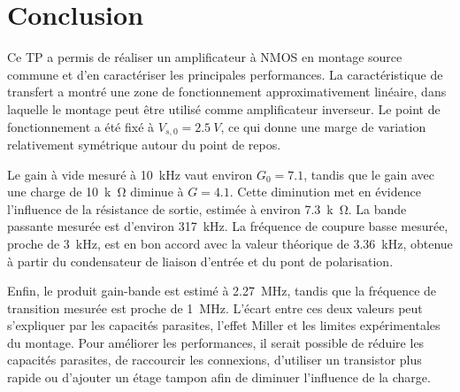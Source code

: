 \documentclass[11pt,a4paper]{article}
\begin{document}
\section{Conclusion}

Ce TP a permis de réaliser un amplificateur à NMOS en montage source commune et d'en caractériser les principales performances. La caractéristique de transfert a montré une zone de fonctionnement approximativement linéaire, dans laquelle le montage peut être utilisé comme amplificateur inverseur. Le point de fonctionnement a été fixé à $V_{s,0}=\SI{2.5}{V}$, ce qui donne une marge de variation relativement symétrique autour du point de repos.

Le gain à vide mesuré à \SI{10}{kHz} vaut environ $G_0=7.1$, tandis que le gain avec une charge de \SI{10}{k\ohm} diminue à $G=4.1$. Cette diminution met en évidence l'influence de la résistance de sortie, estimée à environ \SI{7.3}{k\ohm}. La bande passante mesurée est d'environ \SI{317}{kHz}. La fréquence de coupure basse mesurée, proche de \SI{3}{kHz}, est en bon accord avec la valeur théorique de \SI{3.36}{kHz}, obtenue à partir du condensateur de liaison d'entrée et du pont de polarisation.

Enfin, le produit gain-bande est estimé à \SI{2.27}{MHz}, tandis que la fréquence de transition mesurée est proche de \SI{1}{MHz}. L'écart entre ces deux valeurs peut s'expliquer par les capacités parasites, l'effet Miller et les limites expérimentales du montage. Pour améliorer les performances, il serait possible de réduire les capacités parasites, de raccourcir les connexions, d'utiliser un transistor plus rapide ou d'ajouter un étage tampon afin de diminuer l'influence de la charge.
\end{document}
